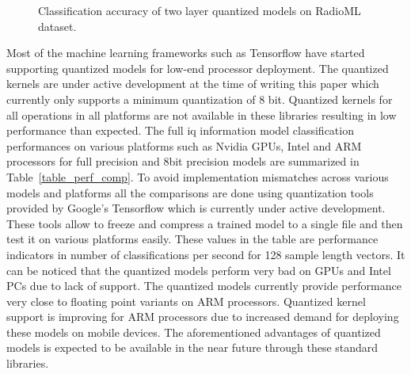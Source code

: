 \begin{figure}[htb]
\caption{Classification accuracy of two layer quantized models on RadioML dataset.}
\label{fig_quant_acc}
\end{figure}

Most of the machine learning frameworks such as Tensorflow have started supporting quantized models for low-end processor deployment. The quantized kernels are under active development at the time of writing this paper which currently only supports a minimum quantization of 8 bit. Quantized kernels for all operations in all platforms are not available in these libraries resulting in low performance than expected. The full \ac{iq} information model classification performances on various platforms such as Nvidia GPUs, Intel and ARM processors for full precision and 8bit precision models are summarized in Table~\ref{table_perf_comp}. To avoid implementation mismatches across various models and platforms all the comparisons are done using quantization tools provided by Google's Tensorflow which is currently under active development. These tools allow to freeze and compress a trained model to a single file and then test it on various platforms easily. These values in the table are performance indicators in number of classifications per second for 128 sample length vectors. It can be noticed that the quantized models perform very bad on GPUs and Intel PCs due to lack of support. The quantized models currently provide performance very close to floating point variants on ARM processors. Quantized kernel support is improving for ARM processors due to increased demand for deploying these models on mobile devices. The aforementioned advantages of quantized models is expected to be available in the near future through these standard libraries.